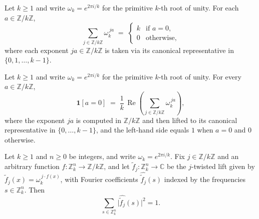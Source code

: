 \begin{lemma}
\label{ZkBLR.geom_sum_toOmega_dual}
\leanok
{}
Let $k \ge 1$ and write $\omega_k = e^{2\pi i/k}$ for the primitive $k$-th root of
unity. For each $a \in \mathbb{Z}/k\mathbb{Z}$,
\[
  \sum_{j \in \mathbb{Z}/k\mathbb{Z}} \omega_k^{\,j a}
  \;=\;
  \begin{cases}
    k & \text{if } a = 0, \\
    0 & \text{otherwise,}
  \end{cases}
\]
where each exponent $ja \in \mathbb{Z}/k\mathbb{Z}$ is taken via its canonical
representative in $\{0, 1, \ldots, k-1\}$.
\end{lemma}

\begin{lemma}
\label{ZkBLR.indicator_eq_char_sum_re}
\leanok
{}
Let $k \ge 1$ and write $\omega_k = e^{2\pi i/k}$ for the primitive $k$-th root of
unity. For every $a \in \mathbb{Z}/k\mathbb{Z}$,
\[
\mathbf{1}[a = 0] \;=\; \frac{1}{k}\,\operatorname{Re}\!\left(\sum_{j \in
\mathbb{Z}/k\mathbb{Z}} \omega_k^{\,ja}\right),
\]
where the exponent $ja$ is computed in $\mathbb{Z}/k\mathbb{Z}$ and then lifted to its
canonical representative in $\{0,\ldots,k-1\}$, and the left-hand side equals $1$ when
$a = 0$ and $0$ otherwise.
\end{lemma}

\begin{lemma}
\label{ZkBLR.parseval_lift_omega_j}
\leanok
{}
Let $k \ge 1$ and $n \ge 0$ be integers, and write $\omega_k = e^{2\pi i/k}$. Fix $j \in
\mathbb{Z}/k\mathbb{Z}$ and an arbitrary function $f : \mathbb{Z}_k^n \to
\mathbb{Z}/k\mathbb{Z}$, and let $\widetilde{f}_j : \mathbb{Z}_k^n \to \mathbb{C}$ be
the $j$-twisted lift given by $\widetilde{f}_j(x) = \omega_k^{\,j\cdot f(x)}$, with
Fourier coefficients $\widehat{\widetilde{f}_j}(s)$ indexed by the frequencies $s \in
\mathbb{Z}_k^n$. Then
\[
\sum_{s \in \mathbb{Z}_k^n} \bigl\lvert \widehat{\widetilde{f}_j}(s) \bigr\rvert^{2} =
1.
\]
\end{lemma}

